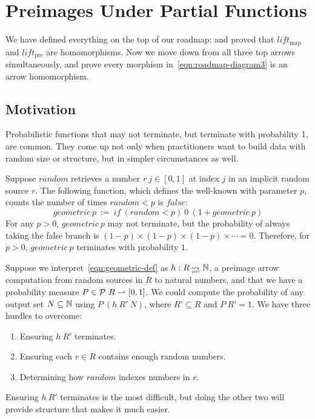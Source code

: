 \documentclass{llncs}
\newcommand{\arrow}{\rightsquigarrow}
\newcommand{\pto}{\rightharpoonup}
\newcommand{\arrowlift}{\ensuremath{lift}}
\newcommand{\map}{_\mathrm{map}}
\newcommand{\liftmap}{\arrowlift\map}
\newcommand{\pre}{_\mathrm{pre}}
\DeclareMathOperator{\preto}{\arrow_{\mspace{-19mu}\pre}}
\newcommand{\liftpre}{\arrowlift\pre}
\begin{document}
\section{Preimages Under Partial Functions}

We have defined everything on the top of our roadmap:
and proved that $\liftmap$ and $\liftpre$ are homomorphisms.
Now we move down from all three top arrows simultaneously, and prove every morphism in~\eqref{eqn:roadmap-diagram3} is an arrow homomorphism.

\subsection{Motivation}

Probabilistic functions that may not terminate, but terminate with probability 1, are common.
They come up not only when practitioners want to build data with random size or structure, but in simpler circumstances as well.

Suppose $random$ retrieves a number $r~j \in [0,1]$ at index $j$ in an implicit random source $r$.
The following function, which defines the well-known  with parameter $p$, counts the number of times $random < p$ is $false$:
\begin{equation}
	geometric~p \ := \ if~(random < p)~0~(1 + geometric~p)
\label{eqn:geometric-def}
\end{equation}
For any $p > 0$, $geometric~p$ may not terminate, but the probability of always taking the false branch is $(1-p) \times (1-p) \times (1-p) \times \cdots = 0$.
Therefore, for $p > 0$, $geometric~p$ terminates with probability $1$.

Suppose we interpret~\eqref{eqn:geometric-def} as $h : R \preto \Nat$, a preimage arrow computation from random sources in $R$ to natural numbers, and that we have a probability measure $P \in \powerset~R \pto [0,1]$.
We could compute the probability of any output set $N \subseteq \mathbb{N}$ using $P~(h~R'~N)$, where $R' \subseteq R$ and $P~R' = 1$. We have three hurdles to overcome:
\begin{enumerate}
	\item Ensuring $h~R'$ terminates.
	\item Ensuring each $r \in R$ contains enough random numbers.
	\item Determining how $random$ indexes numbers in $r$.
\end{enumerate}
Ensuring $h~R'$ terminates is the most difficult, but doing the other two will provide structure that makes it much easier.
\end{document}
